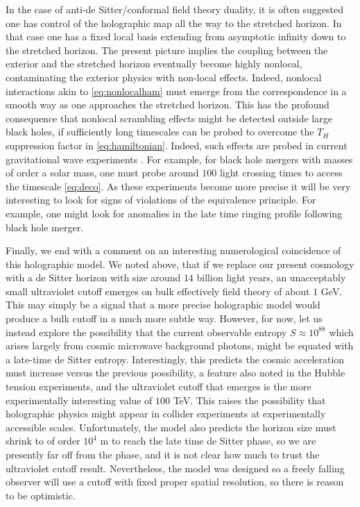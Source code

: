 \documentclass{brownthesis}
\begin{document}
In the case of anti-de Sitter/conformal field theory duality, it is
often suggested one has control of the holographic map all the way
to the stretched horizon. In that case one has a fixed local basis
extending from asymptotic infinity down to the stretched horizon.
The present picture implies the coupling between the exterior and
the stretched horizon eventually become highly nonlocal, contaminating
the exterior physics with non-local effects. Indeed, nonlocal interactions
akin to \eqref{eq:nonlocalham} must emerge from the correspondence
in a smooth way as one approaches the stretched horizon. This has
the profound consequence that nonlocal scrambling effects might be
detected outside large black holes, if sufficiently long timescales
can be probed to overcome the $T_{H}$ suppression factor in \eqref{eq:hamiltonian}.
Indeed, such effects are probed in current gravitational wave experiments
\cite{LIGOScientific:2018mvr}. For example, for black hole mergers
with masses of order a solar mass, one must probe around $100$ light
crossing times to access the timescale \eqref{eq:deco}. As these
experiments become more precise it will be very interesting to look
for signs of violations of the equivalence principle. For example,
one might look for anomalies in the late time ringing profile following
black hole merger.

Finally, we end with a comment on an interesting numerological coincidence
of this holographic model. We noted above, that if we replace our
present cosmology with a de Sitter horizon with size around $14$
billion light years, an unacceptably small ultraviolet cutoff emerges
on bulk effectively field theory of about $1$ GeV. This may simply
be a signal that a more precise holographic model would produce a
bulk cutoff in a much more subtle way. However, for now, let us instead
explore the possibility that the current observable entropy $S\approx10^{88}$
which arises largely from cosmic microwave background photons, might
be equated with a late-time de Sitter entropy. Interestingly, this
predicts the cosmic acceleration must increase versus the previous
possibility, a feature also noted in the Hubble tension experiments,
and the ultraviolet cutoff that emerges is the more experimentally
interesting value of $100$ TeV. This raises the possibility that
holographic physics might appear in collider experiments at experimentally
accessible scales. Unfortunately, the model also predicts the horizon
size must shrink to of order $10^{4}$ m to reach the late time de
Sitter phase, so we are presently far off from the phase, and it is
not clear how much to trust the ultraviolet cutoff result. Nevertheless,
the model was designed so a freely falling observer will use a cutoff
with fixed proper spatial resolution, so there is reason to be optimistic.
\end{document}
